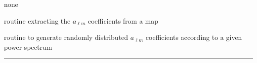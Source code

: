 \begin{modules}
  \begin{sulist}{} %
  \item[none]
  \end{sulist}
\end{modules}

\begin{related}
  \begin{sulist}{} %
  \item[\htmlref{map2alm}{sub:map2alm}] routine extracting the $a_{\ell m}$
  coefficients from a \healpix map
  \item[\htmlref{create\_alm}{sub:create_alm}] routine to generate randomly
  distributed $a_{\ell m}$ coefficients according to a given power spectrum
  \end{sulist}
\end{related}

\rule{\hsize}{2mm}

\newpage
